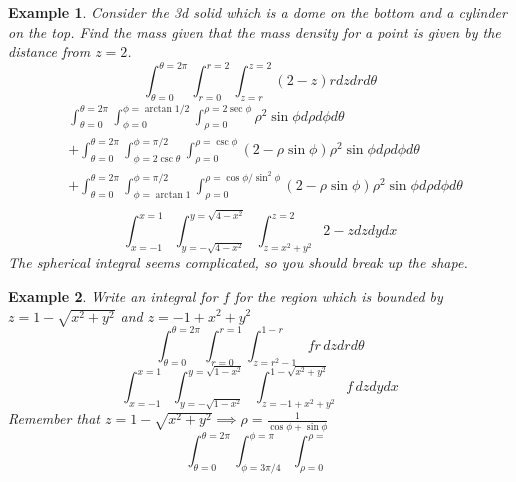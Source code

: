 \documentclass[11pt]{article}
\newtheorem{ex}{Example}
\begin{document}
\begin{ex}
  Consider the 3d solid which is a dome on the bottom and  a
  cylinder on the top.
  Find the mass given that the mass density for a point is given by the
  distance from $z=2$.
  \[\int_{\theta = 0}^{\theta = 2\pi} \int_{r=0}^{r=2} \int_{z=r }^{z = 2} (2-z)r dz dr d\theta\]
\begin{align*}
  &\int_{\theta = 0}^{\theta = 2\pi} \int_{\phi = 0} ^{\phi = \arctan 1/2} \int_{\rho = 0}^{\rho = 2\sec\phi} \rho^2 \sin\phi d\rho d\phi d\theta\\
  &+\int_{\theta = 0}^{\theta = 2\pi} \int_{\phi = 2\csc\theta} ^{\phi = \pi/2} \int_{\rho =0 }^{\rho = \csc\phi}(2-\rho\sin\phi) \rho^2 \sin\phi d\rho d\phi d\theta\\
  &+\int_{\theta = 0}^{\theta = 2\pi} \int_{\phi = \arctan 1} ^{\phi = \pi/2} \int_{\rho = 0}^{\rho = \cos\phi/\sin^2\phi} (2-\rho\sin\phi)\rho^2 \sin\phi d\rho d\phi d\theta\\
\end{align*}
  \[\int_{x=-1}^{x=1} \int_{y= -\sqrt{4-x^2}}^{y=\sqrt{4-x^2}} \int_{z=x^2+y^2}^{z=2} 2-z dz dy dx\]
  The spherical integral seems complicated, so you should break up the shape.
\end{ex}
\begin{ex}
  Write an integral for $f$
  for the region
  which is bounded by $z = 1-\sqrt{x^2+y^2}$ and $z = -1+x^2+y^2$
  \[\int_{\theta = 0}^{\theta = 2\pi} \int_{r=0}^{r=1} \int_{z= r^2-1}^{1-r} fr \, dz dr d\theta \]
  \[\int_{x=-1}^{x=1} \int_{y=-\sqrt{1-x^2}}^{y=\sqrt{1-x^2}} \int_{z=-1+x^2+y^2}^{1-\sqrt{x^2+y^2}} f\, dz dy dx\]
  Remember that $z=1-\sqrt{x^2+y^2} \implies \rho = \frac{1}{\cos\phi + \sin\phi}$
  \[\int_{\theta = 0}^{\theta = 2\pi} \int_{\phi = 3\pi/4}^{\phi=\pi} \int_{\rho = 0}^{\rho = }\]
\end{ex}
\end{document}
